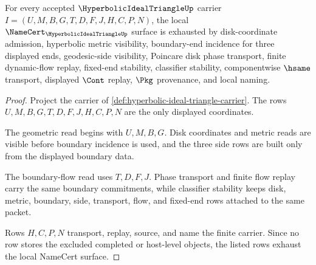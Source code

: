 \begin{theorem}
\label{thm:hyperbolic-ideal-triangle-namecert-obligations}
For every accepted $\HyperbolicIdealTriangleUp$ carrier $I=(U,M,B,G,T,D,F,J,H,C,P,N)$, the local $\NameCert_{\HyperbolicIdealTriangleUp}$ surface is exhausted by disk-coordinate admission, hyperbolic metric visibility, boundary-end incidence for three displayed ends, geodesic-side visibility, Poincare disk phase transport, finite dynamic-flow replay, fixed-end stability, classifier stability, componentwise $\hsame$ transport, displayed $\Cont$ replay, $\Pkg$ provenance, and local naming.
\end{theorem}
\begin{proof}
Project the carrier of \autoref{def:hyperbolic-ideal-triangle-carrier}. The rows $U,M,B,G,T,D,F,J,H,C,P,N$ are the only displayed coordinates.

The geometric read begins with $U,M,B,G$. Disk coordinates and metric reads are visible before boundary incidence is used, and the three side rows are built only from the displayed boundary data.

The boundary-flow read uses $T,D,F,J$. Phase transport and finite flow replay carry the same boundary commitments, while classifier stability keeps disk, metric, boundary, side, transport, flow, and fixed-end rows attached to the same packet.

Rows $H,C,P,N$ transport, replay, source, and name the finite carrier. Since no row stores the excluded completed or host-level objects, the listed rows exhaust the local NameCert surface.
\end{proof}

